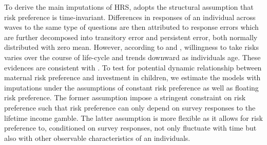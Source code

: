 \documentclass[]{article}
\begin{document}
To derive the main imputations of HRS, \citet{kimball2008imputing} adopts the structural assumption that risk preference is time-invariant. Differences in responses of an individual across waves to the same type of questions are then attributed to response errors which are further decomposed into transitory error and persistent error, both normally distributed with zero mean. However, according to \citet{dohmen2011individual} and \citet{dohmen2017risk}, willingness to take risks varies over the course of life-cycle and trends downward as individuals age. These evidences are consistent with \citet{sahm2012much}. To test for potential dynamic relationship between maternal risk preference and investment in children, we estimate the models with imputations under the assumptions of constant risk preference as well as floating risk preference. The former assumption impose a stringent constraint on risk preference such that risk preference can only depend on survey responses to the lifetime income gamble. The latter assumption is more flexible as it allows for risk preference to, conditioned on survey responses, not only fluctuate with time but also with other observable characteristics of an individuals.  
\end{document}
